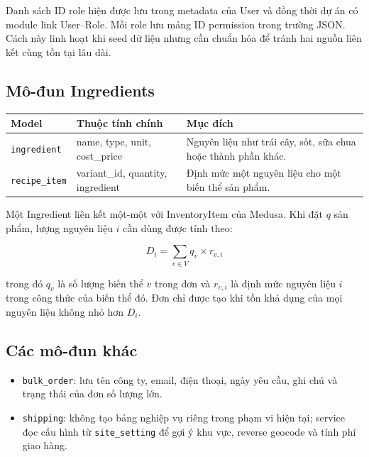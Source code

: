 Danh sách ID role hiện được lưu trong metadata của User và đồng thời dự án có module link User--Role. Mỗi role lưu mảng ID permission trong trường JSON. Cách này linh hoạt khi seed dữ liệu nhưng cần chuẩn hóa để tránh hai nguồn liên kết cùng tồn tại lâu dài.

\subsection{Mô-đun Ingredients}

\begin{longtable}{@{}L{0.22\textwidth} L{0.33\textwidth} L{0.37\textwidth}@{}}
  \toprule
  \textbf{Model} & \textbf{Thuộc tính chính} & \textbf{Mục đích} \\
  \midrule
  \endhead
  \texttt{ingredient} & name, type, unit, cost\_price & Nguyên liệu như trái cây, sốt, sữa chua hoặc thành phần khác. \\
  \texttt{recipe\_item} & variant\_id, quantity, ingredient & Định mức một nguyên liệu cho một biến thể sản phẩm. \\
  \bottomrule
\end{longtable}

Một Ingredient liên kết một-một với InventoryItem của Medusa. Khi đặt $q$ sản phẩm, lượng nguyên liệu $i$ cần dùng được tính theo:

\begin{equation}
  D_i = \sum_{v \in V} q_v \times r_{v,i}
\end{equation}

trong đó $q_v$ là số lượng biến thể $v$ trong đơn và $r_{v,i}$ là định mức nguyên liệu $i$ trong công thức của biến thể đó. Đơn chỉ được tạo khi tồn khả dụng của mọi nguyên liệu không nhỏ hơn $D_i$.

\subsection{Các mô-đun khác}

\begin{itemize}[leftmargin=2em, itemsep=4pt]
  \item \texttt{bulk\_order}: lưu tên công ty, email, điện thoại, ngày yêu cầu, ghi chú và trạng thái của đơn số lượng lớn.
  \item \texttt{shipping}: không tạo bảng nghiệp vụ riêng trong phạm vi hiện tại; service đọc cấu hình từ \texttt{site\_setting} để gợi ý khu vực, reverse geocode và tính phí giao hàng.
\end{itemize}

